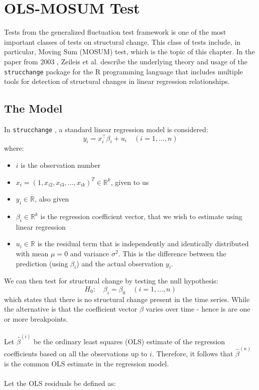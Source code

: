 \documentclass[main.tex]{subfiles}
\begin{document}
\section{OLS-MOSUM Test}
\label{sec:mosum}
Tests from the generalized fluctuation test framework \cite{kuan_hornik}
is one of the most important classes of tests on structural change. This class
of tests include, in particular, Moving Sum (MOSUM) test, which is the topic of this chapter.
In the paper from 2003 \cite{strucchange}, Zeileis et al. describe the
underlying theory and usage of the \texttt{strucchange} package for the
R programming language that includes multiple tools for detection of structural
changes in linear regression relationships.

\subsection{The Model}
\label{sec:mosum}
In \texttt{strucchange} \cite{strucchange}, a standard linear regression model is considered:
\[
y_{i}=x_{i}^{\top} \beta_{i}+u_{i} \quad(i=1, \ldots, n)
\]
where:
\begin{itemize}
\item $i$ is the observation number
\item $x_i = (1,x_{i2}, x_{i3}, ..., x_{ik})^T \in \mathbb{R}^k$, given to us
\item $y_i \in \mathbb{R}$, also given
\item $\beta_i \in \mathbb{R}^{k} $ is the regression coefficient vector, that
  we wish to estimate using linear regression
\item $u_i \in \mathbb{R}$ is the residual term that is independently and identically
  distributed with mean $\mu = 0$ and variance $\sigma^2$. This is the
  difference between the prediction (using $\beta_i$) and the actual observation $y_i$.
\end{itemize}
We can then test for structural change by testing the null hypothesis:
\[
H_0:\quad \beta_i = \beta_0 \quad(i=1, \ldots, n)
\]
which states that there is no structural change present in the time series.
While the alternative is that the coefficient vector $\beta$ varies over time -
hence is are one or more breakpoints. \\\\
Let $\hat{\beta}^{(i)}$ be the ordinary least squares (OLS) estimate of the
regression coefficients based on all the observations up to $i$.
Therefore, it follows that $\hat{\beta}^{(n)}$ is the common OLS estimate in the regression model. \\\\
Let the OLS residuals be defined as:
\end{document}
